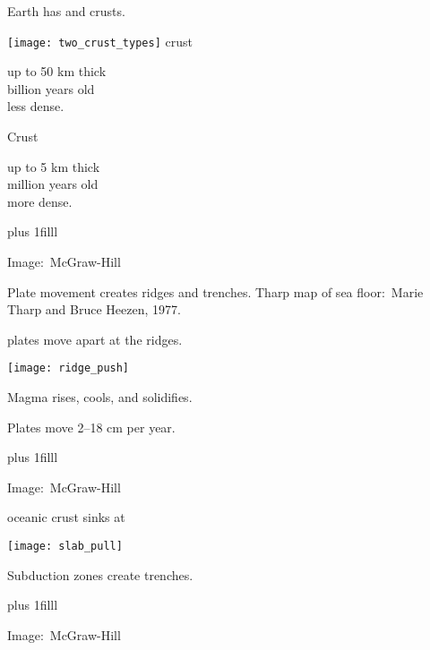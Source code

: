 \documentclass[t]{beamer}
\begin{document}
\begin{frame}[t]{Earth has  and  crusts.}
\begin{multicols}{2}
\texttt{[image: two\_crust\_types]}
\columnbreak
	\hangpara {} crust

	\hangpara\quad up to 50 km thick\\
			 billion years old\\
			\quad less dense.
	
	\hangpara {} Crust
	
	\hangpara\quad up to 5 km thick\\
			 million years old\\
			\quad more dense.
	
\end{multicols}

\vskip0pt plus 1filll

\tiny Image: \textcopyright\,McGraw-Hill

\end{frame}

{
\begin{frame}[b]{Plate movement creates ridges and trenches.}
\tiny Tharp map of sea floor: \textcopyright\,Marie Tharp and Bruce Heezen, 1977.
\end{frame}
}

\begin{frame}[t]{ plates move apart at the ridges.}
\begin{multicols}{2}
\texttt{[image: ridge\_push]}
\columnbreak

	\hangpara Magma rises, cools, and solidifies.

	\hangpara Plates move 2–18 cm per year.
		
\end{multicols}

\vskip0pt plus 1filll

\tiny Image: \textcopyright\,McGraw-Hill

\end{frame}

\begin{frame}[t]{ oceanic crust sinks at }
\begin{multicols}{2}
\texttt{[image: slab\_pull]}
\columnbreak

	\vspace*{4\baselineskip}
	
	\hangpara Subduction zones create trenches.
\end{multicols}

\vskip0pt plus 1filll

\tiny Image: \textcopyright\,McGraw-Hill

\end{frame}
\end{document}
